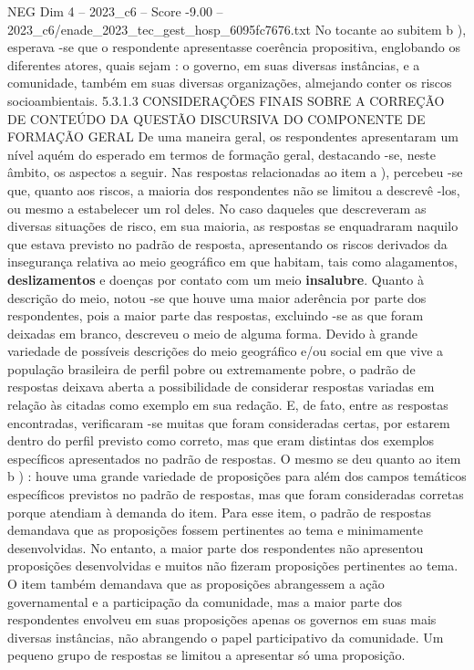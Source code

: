 \begin{textsample}{NEG Dim 4 – 2023\_c6 – Score -9.00 – 2023\_c6/enade\_2023\_tec\_gest\_hosp\_6095fc7676.txt}
No tocante ao subitem b ), esperava -se que o respondente apresentasse coerência propositiva, englobando os diferentes atores, quais sejam : o governo, em suas diversas instâncias, e a comunidade, também em suas diversas organizações, almejando conter os riscos socioambientais. 5.3.1.3 CONSIDERAÇÕES FINAIS SOBRE A CORREÇÃO DE CONTEÚDO DA QUESTÃO DISCURSIVA DO COMPONENTE DE FORMAÇÃO GERAL De uma maneira geral, os respondentes apresentaram um nível aquém do esperado em termos de formação geral, destacando -se, neste âmbito, os aspectos a seguir.
Nas respostas relacionadas ao item a ), percebeu -se que, quanto aos riscos, a maioria dos respondentes não se limitou a descrevê -los, ou mesmo a estabelecer um rol deles.
No caso daqueles que descreveram as diversas situações de risco, em sua maioria, as respostas se enquadraram naquilo que estava previsto no padrão de resposta, apresentando os riscos derivados da insegurança relativa ao meio geográfico em que habitam, tais como alagamentos, \textbf{deslizamentos} e doenças por contato com um meio \textbf{insalubre}.
Quanto à descrição do meio, notou -se que houve uma maior aderência por parte dos respondentes, pois a maior parte das respostas, excluindo -se as que foram deixadas em branco, descreveu o meio de alguma forma.
Devido à grande variedade de possíveis descrições do meio geográfico e/ou social em que vive a população brasileira de perfil pobre ou extremamente pobre, o padrão de respostas deixava aberta a possibilidade de considerar respostas variadas em relação às citadas como exemplo em sua redação.
E, de fato, entre as respostas encontradas, verificaram -se muitas que foram consideradas certas, por estarem dentro do perfil previsto como correto, mas que eram distintas dos exemplos específicos apresentados no padrão de respostas.
O mesmo se deu quanto ao item b ) : houve uma grande variedade de proposições para além dos campos temáticos específicos previstos no padrão de respostas, mas que foram consideradas corretas porque atendiam à demanda do item.
Para esse item, o padrão de respostas demandava que as proposições fossem pertinentes ao tema e minimamente desenvolvidas.
No entanto, a maior parte dos respondentes não apresentou proposições desenvolvidas e muitos não fizeram proposições pertinentes ao tema.
O item também demandava que as proposições abrangessem a ação governamental e a participação da comunidade, mas a maior parte dos respondentes envolveu em suas proposições apenas os governos em suas mais diversas instâncias, não abrangendo o papel participativo da comunidade.
Um pequeno grupo de respostas se limitou a apresentar só uma proposição.

\end{textsample}
